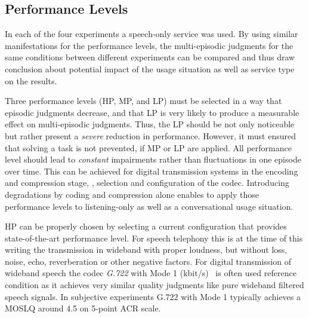 
\subsection{Performance Levels}
In each of the four experiments a speech-only service was used.
By using similar manifestations for the performance levels, the multi-episodic judgments for the same conditions between different experiments can be compared and thus draw conclusion about potential impact of the usage situation as well as service type on the results.

Three performance levels (\ac{HP}, \ac{MP}, and \ac{LP}) must be selected in a way that episodic judgments decrease, and that \ac{LP} is very likely to produce a measurable effect on multi-episodic judgments.
Thus, the \ac{LP} should be not only noticeable but rather present a \emph{severe} reduction in performance. 
However, it must ensured that solving a task is not prevented, if \ac{MP} or \ac{LP} are applied.
All performance level should lead to \emph{constant} impairments rather than fluctuations in one episode over time.
This can be achieved for digital transmission systems in the encoding and compression stage, \eg, selection and configuration of the codec.
Introducing degradations by coding and compression alone enables to apply those performance levels to listening-only as well as a conversational usage situation.

\ac{HP} can be properly chosen by selecting a current configuration that provides state-of-the-art performance level.
For speech telephony this is at the time of this writing the transmission in wideband with proper loudness, but without loss, noise, echo, reverberation or other negative factors.
For digital transmission of wideband speech the codec \emph{G.722} with Mode 1 (\unit[64]{kbit/s})~\cite{itu-t_g.722} is often used reference condition as it achieves very similar quality judgments like pure wideband filtered speech signals. %
In subjective experiments G.722 with Mode 1 typically achieves a \ac{MOSLQ} around 4.5 on 5-point \ac{ACR} scale.

